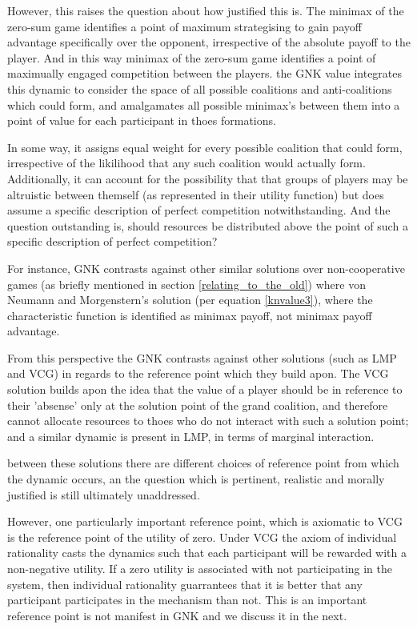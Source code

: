 However, this raises the question about how justified this is.
The minimax of the zero-sum game identifies a point of maximum strategising to gain payoff advantage specifically over the opponent, irrespective of the absolute payoff to the player.
And in this way minimax of the zero-sum game identifies a point of maximually engaged competition between the players.
the GNK value integrates this dynamic to consider the space of all possible coalitions and anti-coalitions which could form, and amalgamates all possible minimax's between them into a point of value for each participant in thoes formations.

In some way, it assigns equal weight for every possible coalition that could form, irrespective of the likilihood that any such coalition would actually form.
Additionally, it can account for the possibility that that groups of players may be altruistic between themself (as represented in their utility function) but does assume a specific description of perfect competition notwithstanding.
And the question outstanding is, should resources be distributed above the point of such a specific description of perfect competition?

For instance, GNK contrasts against other similar solutions over non-cooperative games (as briefly mentioned in section \ref{relating_to_the_old}) where von Neumann and Morgenstern's solution (per equation \ref{knvalue3}), where the characteristic function is identified as minimax payoff, not minimax payoff advantage.

From this perspective the GNK contrasts against other solutions (such as LMP and VCG) in regards to the reference point which they build apon.
The VCG solution builds apon the idea that the value of a player should be in reference to their 'absense' only at the solution point of the grand coalition, and therefore cannot allocate resources to thoes who do not interact with such a solution point; and a similar dynamic is present in LMP, in terms of marginal interaction.

between these solutions there are different choices of reference point from which the dynamic occurs, an the question which is pertinent, realistic and morally justified is still ultimately unaddressed.

However, one particularly important reference point, which is axiomatic to VCG is the reference point of the utility of zero.
Under VCG the axiom of individual rationality casts the dynamics such that each participant will be rewarded with a non-negative utility.
If a zero utility is associated with not participating in the system, then individual rationality guarrantees that it is better that any participant participates in the mechanism than not.
This is an important reference point is not manifest in GNK and we discuss it in the next.

